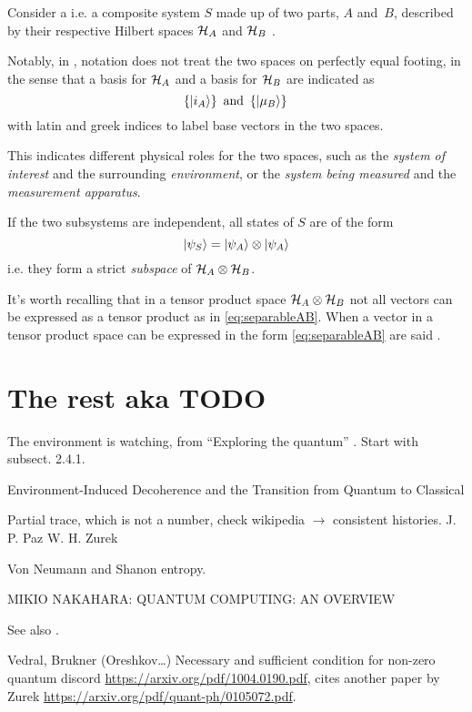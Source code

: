Consider a 
i.e. a composite system $S$
made up of two parts, $A$ and~$B$,
described by their respective Hilbert spaces
$\mathcal{H}_A$ and $\mathcal{H}_B$ \parencite{Haroche_Exploring}.

Notably, in \cite{Haroche_Exploring},
notation does not treat the two spaces
on perfectly equal footing,
in the sense that a basis for $\mathcal{H}_A$ and a basis for $\mathcal{H}_B$
are indicated as
$$
  \left\{\ket{i_A}\right\} \text{ and } \left\{\ket{\mu_B}\right\}\,
$$
with latin and greek indices to label base vectors in the two spaces.

This indicates different physical roles for the two spaces,
such as the \emph{system of interest} and the surrounding \emph{environment},
or the \emph{system being measured} and the \emph{measurement apparatus}.

If the two subsystems are independent, all states of $S$ are of the form
\begin{equation}\label{eq:separableAB}
  \ket{\psi_S} = \ket{\psi_A}\otimes\ket{\psi_A}
\end{equation}
i.e. they form a strict \emph{subspace} of $\mathcal{H}_A\otimes\mathcal{H}_B$.

It's worth recalling that in a tensor product space $\mathcal{H}_A\otimes\mathcal{H}_B$
not all vectors can be expressed as a tensor product as in \eqref{eq:separableAB}.
When a vector in a tensor product space
can be expressed in the form \eqref{eq:separableAB}
are said .

\section{The rest aka TODO}

The environment is watching, from ``Exploring the quantum''
\parencite[Ch. 4]{Haroche_Exploring}. Start with subsect. 2.4.1.

Environment-Induced Decoherence and the Transition from Quantum to Classical

Partial trace, which is not a number, check wikipedia $\rightarrow$ consistent histories.
J. P. Paz W. H. Zurek

Von Neumann and Shanon entropy.

MIKIO NAKAHARA: QUANTUM COMPUTING: AN OVERVIEW

See also \cite{Schlosshauer_Decoherence}.

Vedral, Brukner (Oreshkov\dots)
Necessary and sufficient condition for non-zero quantum discord
\url{https://arxiv.org/pdf/1004.0190.pdf},
cites another paper by Zurek \url{https://arxiv.org/pdf/quant-ph/0105072.pdf}.

